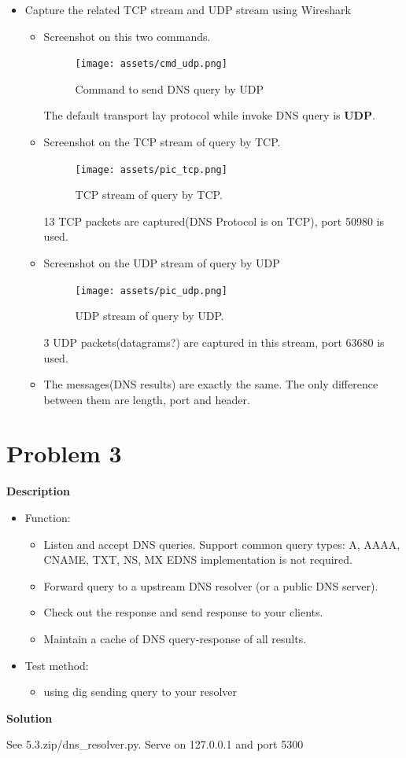\documentclass[12pt,letterpaper]{ctexart}
\begin{document}
\begin{itemize}
  \item Capture the related TCP stream and UDP stream using Wireshark
  \begin{itemize}
    \item Screenshot on this two commands.
    \begin{figure}[H]
      \centering
      \texttt{[image: assets/cmd\_udp.png]}
      \caption{Command to send DNS query by UDP}
      \label{fig:cmd_udp}
    \end{figure}

    The default transport lay protocol while invoke DNS query is {\bf UDP}.
    \item Screenshot on the TCP stream of query by TCP.

    \begin{figure}[H]
      \centering
      \texttt{[image: assets/pic\_tcp.png]}
      \caption{TCP stream of query by TCP.}
      \label{fig:pic_tcp}
    \end{figure}
    13 TCP packets are captured(DNS Protocol is on TCP), port 50980 is used.
    \item Screenshot on the UDP stream of query by UDP

    \begin{figure}[H]
      \centering
      \texttt{[image: assets/pic\_udp.png]}
      \caption{UDP stream of query by UDP.}
      \label{fig:pic_udp}
    \end{figure}
    3 UDP packets(datagrams?) are captured in this stream, port 63680 is used.
    \item The messages(DNS results) are exactly the same. The only difference between them are length, port and header.
  \end{itemize}
\end{itemize}

\newpage

\section*{Problem 3}

{\bf Description}

\begin{itemize}
  \item Function:
  \begin{itemize}
    \item Listen and accept DNS queries. Support common query types: A, AAAA, CNAME, TXT, NS, MX
    EDNS implementation is not required.
    \item Forward query to a upstream DNS resolver (or a public DNS server).
    \item Check out the response and send response to your clients.
    \item Maintain a cache of DNS query-response of all results.
  \end{itemize}
  \item Test method:
  \begin{itemize}
    \item using dig sending query to your resolver
  \end{itemize}
\end{itemize}

{\bf Solution}

See 5.3.zip/dns\_resolver.py. Serve on 127.0.0.1 and port 5300
\end{document}
